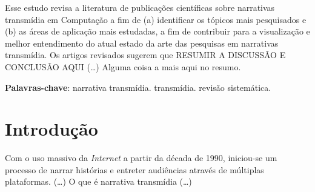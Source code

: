 \documentclass[
article,			%
11pt,				%
oneside,			%
a4paper,			%
english,			%
brazil,				%
sumario=tradicional
]{abntex2}
\begin{document}

  \frenchspacing


  \maketitle

  \begin{resumoumacoluna}
    Esse estudo revisa a literatura de publicações científicas sobre narrativas transmídia em Computação a fim de (a) identificar os tópicos mais pesquisados e (b) as áreas de aplicação mais estudadas, a fim de contribuir para a visualização e melhor entendimento do atual estado da arte das pesquisas em narrativas transmídia. Os artigos revisados sugerem que \textsf{RESUMIR A DISCUSSÃO E CONCLUSÃO AQUI} (\ldots) Alguma coisa a mais aqui no resumo.

    \vspace{\onelineskip}

    \noindent
    \textbf{Palavras-chave}: narrativa transmídia. transmídia. revisão sistemática.
  \end{resumoumacoluna}


  \textual

  \section{Introdução}

  Com o uso massivo da \textit{Internet} a partir da década de 1990, iniciou-se um processo de narrar histórias e entreter audiências através de múltiplas plataformas. (\ldots) O que é narrativa transmídia (\ldots)
\end{document}

